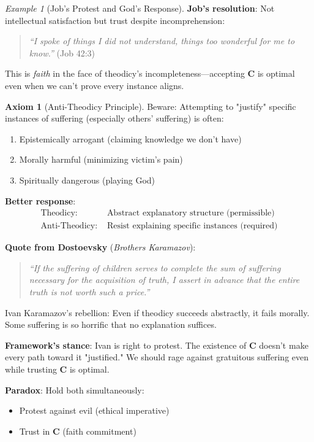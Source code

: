 \documentclass[11pt,a4paper]{article}
\theoremstyle{definition}
\newtheorem{axiom}{Axiom}[section]
\theoremstyle{remark}
\newtheorem{example}{Example}[section]
\begin{document}
\begin{enumerate}
\begin{example}[Job's Protest and God's Response]
\textbf{Job's resolution}: Not intellectual satisfaction but trust despite incomprehension:
\begin{quote}
\textit{``I spoke of things I did not understand, things too wonderful for me to know.''} (Job 42:3)
\end{quote}

This is \textit{faith} in the face of theodicy's incompleteness—accepting \(\mathbf{C}\) is optimal even when we can't prove every instance aligns.
\end{example}

\begin{axiom}[Anti-Theodicy Principle]
Beware: Attempting to "justify" specific instances of suffering (especially others' suffering) is often:
\begin{enumerate}
    \item Epistemically arrogant (claiming knowledge we don't have)
    \item Morally harmful (minimizing victim's pain)
    \item Spiritually dangerous (playing God)
\end{enumerate}

\textbf{Better response}:
\begin{align}
\text{Theodicy: } &\text{Abstract explanatory structure (permissible)} \\
\text{Anti-Theodicy: } &\text{Resist explaining specific instances (required)}
\end{align}

\textbf{Quote from Dostoevsky} (\textit{Brothers Karamazov}):
\begin{quote}
\textit{``If the suffering of children serves to complete the sum of suffering necessary for the acquisition of truth, I assert in advance that the entire truth is not worth such a price.''}
\end{quote}

Ivan Karamazov's rebellion: Even if theodicy succeeds abstractly, it fails morally. Some suffering is so horrific that no explanation suffices.

\textbf{Framework's stance}: Ivan is right to protest. The existence of \(\mathbf{C}\) doesn't make every path toward it "justified." We should rage against gratuitous suffering even while trusting \(\mathbf{C}\) is optimal.

\textbf{Paradox}: Hold both simultaneously:
\begin{itemize}
    \item Protest against evil (ethical imperative)
    \item Trust in \(\mathbf{C}\) (faith commitment)
\end{itemize}


\end{axiom}
\end{enumerate}
\end{document}
